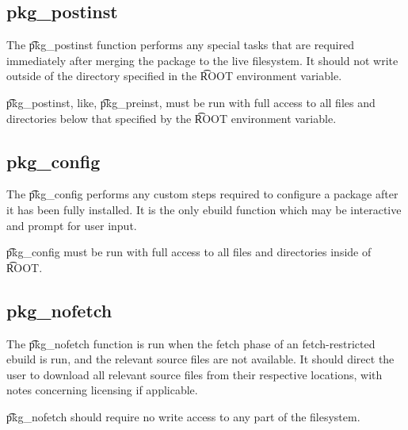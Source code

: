 \subsection{pkg\_postinst}
\label{pkg-postinst-function}

The \t{pkg\_postinst} function performs any special tasks that are required immediately after
merging the package to the live filesystem. It should not write outside of the directory specified
in the \t{ROOT} environment variable.

\t{pkg\_postinst}, like, \t{pkg\_preinst}, must be run with full access to all files and directories
below that specified by the \t{ROOT} environment variable.

\subsection{pkg\_config}
\label{pkg-config-function}

The \t{pkg\_config} performs any custom steps required to configure a package after it has been
fully installed. It is the only ebuild function which may be interactive and prompt for user input.

\t{pkg\_config} must be run with full access to all files and directories inside of \t{ROOT}.

\subsection{pkg\_nofetch}
\label{pkg-nofetch-function}

The \t{pkg\_nofetch} function is run when the fetch phase of an fetch-restricted ebuild is run, and
the relevant source files are not available. It should direct the user to download all relevant
source files from their respective locations, with notes concerning licensing if applicable.

\t{pkg\_nofetch} should require no write access to any part of the filesystem.


